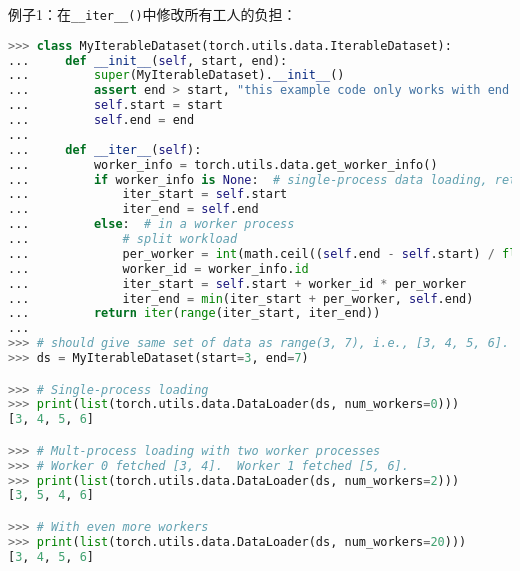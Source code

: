 \documentclass[../main.tex]{subfile}
\begin{document}
例子1：在\lstinline{__iter__()}中修改所有工人的负担：

\begin{lstlisting}[language=Python]
>>> class MyIterableDataset(torch.utils.data.IterableDataset):
...     def __init__(self, start, end):
...         super(MyIterableDataset).__init__()
...         assert end > start, "this example code only works with end >= start"
...         self.start = start
...         self.end = end
...
...     def __iter__(self):
...         worker_info = torch.utils.data.get_worker_info()
...         if worker_info is None:  # single-process data loading, return the full iterator
...             iter_start = self.start
...             iter_end = self.end
...         else:  # in a worker process
...             # split workload
...             per_worker = int(math.ceil((self.end - self.start) / float(worker_info.num_workers)))
...             worker_id = worker_info.id
...             iter_start = self.start + worker_id * per_worker
...             iter_end = min(iter_start + per_worker, self.end)
...         return iter(range(iter_start, iter_end))
...
>>> # should give same set of data as range(3, 7), i.e., [3, 4, 5, 6].
>>> ds = MyIterableDataset(start=3, end=7)

>>> # Single-process loading
>>> print(list(torch.utils.data.DataLoader(ds, num_workers=0)))
[3, 4, 5, 6]

>>> # Mult-process loading with two worker processes
>>> # Worker 0 fetched [3, 4].  Worker 1 fetched [5, 6].
>>> print(list(torch.utils.data.DataLoader(ds, num_workers=2)))
[3, 5, 4, 6]

>>> # With even more workers
>>> print(list(torch.utils.data.DataLoader(ds, num_workers=20)))
[3, 4, 5, 6]
\end{lstlisting}
\end{document}
